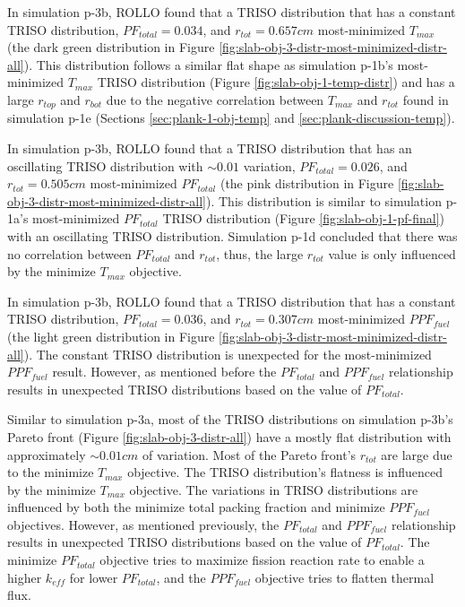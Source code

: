 In simulation p-3b, \gls{ROLLO} found that a TRISO distribution that has a 
constant TRISO distribution, $PF_{total} = 0.034$, and $r_{tot}=0.657cm$ most-minimized 
$T_{max}$ (the dark green distribution in Figure 
\ref{fig:slab-obj-3-distr-most-minimized-distr-all}).
This distribution follows a similar flat shape as simulation p-1b's most-minimized 
$T_{max}$ TRISO distribution (Figure \ref{fig:slab-obj-1-temp-distr}) and has a large 
$r_{top}$ and $r_{bot}$ due to the negative correlation between $T_{max}$ and $r_{tot}$
found in simulation p-1e (Sections \ref{sec:plank-1-obj-temp} and 
\ref{sec:plank-discussion-temp}). 

In simulation p-3b, \gls{ROLLO} found that a TRISO distribution that has an 
oscillating TRISO distribution with $\sim0.01$ variation, $PF_{total} = 0.026$, and 
$r_{tot}=0.505cm$ most-minimized $PF_{total}$
(the pink distribution in Figure \ref{fig:slab-obj-3-distr-most-minimized-distr-all}).
This distribution is similar to simulation p-1a's most-minimized $PF_{total}$ TRISO 
distribution (Figure \ref{fig:slab-obj-1-pf-final}) with an oscillating TRISO 
distribution.
Simulation p-1d concluded that there was no correlation between $PF_{total}$ and $r_{tot}$, 
thus, the large $r_{tot}$ value is only influenced by the minimize $T_{max}$ objective. 

In simulation p-3b, \gls{ROLLO} found that a TRISO distribution that has a 
constant TRISO distribution, $PF_{total} = 0.036$, and $r_{tot}=0.307cm$ most-minimized 
$PPF_{fuel}$ (the light green distribution in Figure 
\ref{fig:slab-obj-3-distr-most-minimized-distr-all}).
The constant TRISO distribution is unexpected for the most-minimized $PPF_{fuel}$ result. 
However, as mentioned before the $PF_{total}$ and $PPF_{fuel}$ relationship
results in unexpected TRISO distributions based on the value of $PF_{total}$. 

Similar to simulation p-3a, most of the \gls{TRISO} distributions on simulation 
p-3b's Pareto front (Figure \ref{fig:slab-obj-3-distr-all}) have a mostly flat 
distribution with approximately $\sim0.01cm$ of variation. 
Most of the Pareto front's $r_{tot}$ are large due to the minimize $T_{max}$ objective. 
The TRISO distribution's flatness is influenced by the minimize $T_{max}$ objective. 
The variations in \gls{TRISO} distributions are influenced by both the minimize 
total packing fraction and minimize $PPF_{fuel}$ objectives. 
However, as mentioned previously, the $PF_{total}$ and $PPF_{fuel}$ relationship
results in unexpected TRISO distributions based on the value of $PF_{total}$. 
The minimize $PF_{total}$ objective tries to maximize fission reaction rate
to enable a higher $k_{eff}$ for lower $PF_{total}$, and 
the $PPF_{fuel}$ objective tries to flatten thermal flux. 

